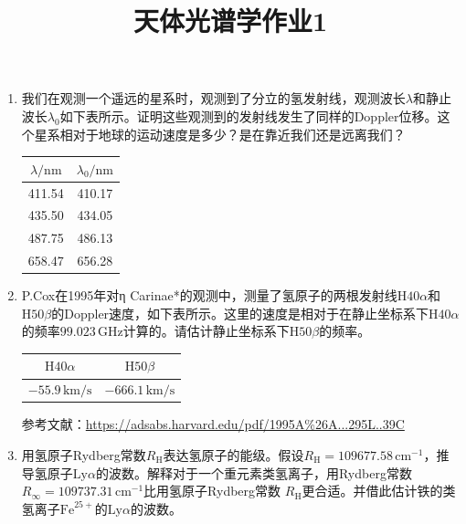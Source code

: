 \documentclass[a4paper]{article}
\begin{document}
\title{\textbf{天体光谱学作业1}}
\author{}
\date{}
\maketitle

\begin{enumerate}
    \item[1.] 我们在观测一个遥远的星系时，观测到了分立的氢发射线，观测波长$\lambda$和静止波长$\lambda_0$如下表所示。证明这些观测到的发射线发生了同样的Doppler位移。这个星系相对于地球的运动速度是多少？是在靠近我们还是远离我们？
    \begin{table}[!ht]
        \centering
        \begin{tabular}{|c|c|}
            \hline
            $\lambda/\mathrm{nm}$ & $\lambda_0/\mathrm{nm}$ \\
            \hline
            411.54 & 410.17 \\
            \hline
            435.50 & 434.05 \\
            \hline
            487.75 & 486.13 \\
            \hline
            658.47 & 656.28 \\
            \hline
        \end{tabular}
    \end{table}

    \item[2.] P.Cox在1995年对η Carinae*的观测中，测量了氢原子的两根发射线$\mathrm{H}40\alpha$和$\mathrm{H}50\beta$的Doppler速度，如下表所示。这里的速度是相对于在静止坐标系下$\mathrm{H}40\alpha$的频率$99.023\,\mathrm{GHz}$计算的。请估计静止坐标系下$\mathrm{H}50\beta$的频率。
    \begin{table}[!ht]
        \centering
        \begin{tabular}{|c|c|}
            \hline
            $\mathrm{H}40\alpha$ & $\mathrm{H}50\beta$ \\
            \hline
            $-55.9\,\mathrm{km/s}$ & $-666.1\,\mathrm{km/s}$ \\
            \hline
        \end{tabular}
    \end{table}
    
    参考文献：\url{https://adsabs.harvard.edu/pdf/1995A%26A...295L..39C}

    \item[3.] 用氢原子Rydberg常数$R_{\mathrm{H}}$表达氢原子的能级。假设$R_{\mathrm{H}}=109677.58\,\mathrm{cm^{-1}}$，推导氢原子$\mathrm{Ly}\alpha$的波数。解释对于一个重元素类氢离子，用Rydberg常数$R_\infty=109737.31\,\mathrm{cm^{-1}}$比用氢原子Rydberg常数 $R_{\mathrm{H}}$更合适。并借此估计铁的类氢离子$\mathrm{Fe}^{25+}$的$\mathrm{Ly}\alpha$的波数。


\end{enumerate}
\end{document}
